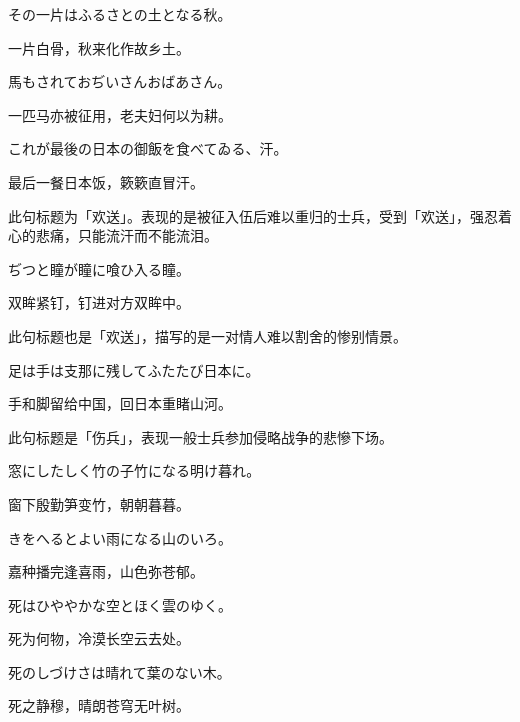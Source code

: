\begin{haiku}
    {\FH その一片はふるさとの土となる秋。}

    {\FK 一片白骨，秋来化作故乡土。}
\end{haiku}

\begin{haiku}
    {\FH 馬もされておぢいさんおばあさん。}

    {\FK 一匹马亦被征用，老夫妇何以为耕。}
\end{haiku}

\begin{haiku}
    {\FH これが最後の日本の御飯を食べてゐる、汗。}

    {\FK 最后一餐日本饭，簌簌直冒汗。}

    {\FS 此句标题为「欢送」。表现的是被征入伍后难以重归的士兵，受到「欢送」，强忍着心的悲痛，只能流汗而不能流泪。}
\end{haiku}

\begin{haiku}
    {\FH ぢつと瞳が瞳に喰ひ入る瞳。}

    {\FK 双眸紧钉，钉进对方双眸中。}

    {\FS 此句标题也是「欢送」，描写的是一对情人难以割舍的惨别情景。}
\end{haiku}

\begin{haiku}
    {\FH 足は手は支那に残してふたたび日本に。}

    {\FK 手和脚留给中国，回日本重睹山河。}

    {\FS 此句标题是「伤兵」，表现一般士兵参加侵略战争的悲慘下场。}
\end{haiku}

\begin{haiku}
    {\FH 窓にしたしく竹の子竹になる明け暮れ。}

    {\FK 窗下殷勤笋变竹，朝朝暮暮。}
\end{haiku}

\begin{haiku}
    {\FH {}きをへるとよい雨になる山のいろ。}

    {\FK 嘉种播完逢喜雨，山色弥苍郁。}
\end{haiku}

\begin{haiku}
    {\FH 死はひややかな空とほく雲のゆく。}

    {\FK 死为何物，冷漠长空云去处。}
\end{haiku}

\begin{haiku}
    {\FH 死のしづけさは晴れて葉のない木。}

    {\FK 死之静穆，晴朗苍穹无叶树。}
\end{haiku}

